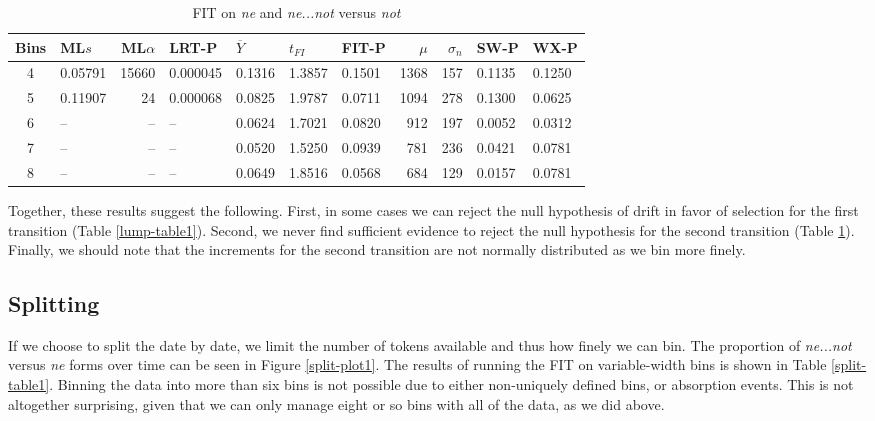 \begin{table}[ht]
\centering
\begin{tabular}{c  l  r  l  l  l  l   r  r  l l }
  \hline
Bins & ML$s$ & ML$\alpha$ & LRT-P & $\overline{Y}$ & $t_{FI}$ & FIT-P & $\mu$ & $\sigma_n$ & SW-P & WX-P \\
  \hline
  4 & 0.05791 & 15660 & 0.000045 & 0.1316 & 1.3857 & 0.1501 & 1368 & 157 & 0.1135 & 0.1250 \\
  5 & 0.11907 & 24 & 0.000068 & 0.0825 & 1.9787 & 0.0711 & 1094 & 278 & 0.1300 & 0.0625 \\ 
  6 & -- & -- & --  & 0.0624 & 1.7021 & 0.0820 & 912 & 197 & 0.0052 & 0.0312 \\
  7 & -- & -- & -- & 0.0520 & 1.5250 & 0.0939 & 781 & 236 & 0.0421 & 0.0781 \\ 
  8 & -- & -- & --  & 0.0649 & 1.8516 & 0.0568 & 684 & 129 & 0.0157 & 0.0781 \\    \hline
\end{tabular}
\caption{FIT on \textit{\color{red}  ne} and \textit{\color{blue} ne...not} versus  \textit{\color{green} not} }
\label{lump-table2}
\end{table}


Together, these results suggest the following. First, in some cases we can reject the null hypothesis of drift in favor of selection for the first transition (Table \ref{lump-table1}). Second, we never find sufficient evidence to reject the null hypothesis for the second transition (Table \ref{lump-table2}). Finally, we should note that  the increments for the second transition are not normally distributed as we bin more finely.


\subsection{Splitting}

If we choose to split the date by date, we limit the number of tokens available and thus how finely we can bin. The proportion of \textit{\color{blue} ne...not}  versus \textit{\color{red} ne} forms over time can be seen in Figure \ref{split-plot1}. The results of running the FIT on variable-width bins is shown in Table \ref{split-table1}. Binning the data into more than six bins is not possible due to either  non-uniquely defined bins, or absorption events. This is not altogether surprising, given that we can only manage eight or so bins with all of the data, as we did above.


